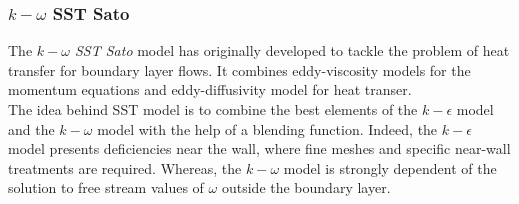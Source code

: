 \documentclass[11pt,a4paper]{article}
\begin{document}
\subsubsection{\boldmath$k-\omega$ SST Sato}
The \textit{$k-\omega$ SST Sato} model \citep{SSTSato} has originally developed to tackle the problem of heat transfer for boundary layer flows. It combines eddy-viscosity models for the momentum equations and eddy-diffusivity model for heat transer. \\
The idea behind SST model is to combine the best elements of the $k-\epsilon$ model and the $k-\omega$ model with the help of a blending function. Indeed, the $k-\epsilon$ model presents deficiencies near the wall, where fine meshes and specific near-wall treatments are required. Whereas, the $k-\omega$ model is strongly dependent of the solution to free stream values of $\omega$ outside the boundary layer.
\end{document}
